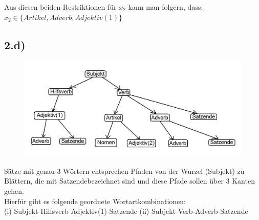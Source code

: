 \documentclass[a4paper]{article}
\begin{document}
Aus diesen beiden Restriktionen f\"ur $x_2$ kann man folgern, dass: $x_2 \in \{Artikel, Adverb, Adjektiv(1)\}$



\pagebreak
\subsection*{2.d)}
\begin{figure}[!htbp]
\centering
\includegraphics[width = 1\columnwidth]{blatt6aufgabe2d}
\end{figure}

S\"atze mit genau 3 W\"ortern entsprechen Pfaden von der Wurzel (Subjekt) zu Blättern, die mit \glqq Satzende\grqq bezeichnet sind und diese Pfade sollen über 3 Kanten gehen. \\
Hierfür gibt es folgende geordnete Wortartkombinationen: \\
(i) Subjekt-Hilfsverb-Adjektiv(1)-Satzende
(ii) Subjekt-Verb-Adverb-Satzende
\end{document}

